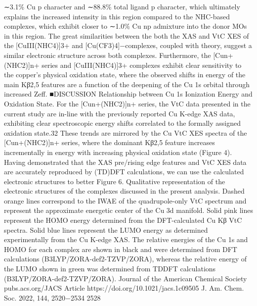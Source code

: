 \documentclass{article}
\begin{document}
∼3.1\% Cu p character and ∼88.8\% total ligand p character,
which ultimately explains the increased intensity in this region
compared to the NHC-based complexes, which exhibit closer
to ∼1.0\% Cu np admixture into the donor MOs in this region.
The great similarities between the both the XAS and VtC
XES of the [CuIII(NHC4)]3+ and [Cu(CF3)4]−complexes,
coupled with theory, suggest a similar electronic structure
across both complexes. Furthermore, the [Cun+(NHC2)]n+
series and [CuIII(NHC4)]3+ complexes exhibit clear sensitivity
to the copper’s physical oxidation state, where the observed
shifts in energy of the main Kβ2,5 features are a function of the
deepening of the Cu 1s orbital through increased Zeff.
■DISCUSSION
Relationship between Cu 1s Ionization Energy and
Oxidation State. For the [Cun+(NHC2)]n+ series, the VtC
data presented in the current study are in-line with the
previously reported Cu K-edge XAS data, exhibiting clear
spectroscopic energy shifts correlated to the formally assigned
oxidation state.32 These trends are mirrored by the Cu VtC
XES spectra of the [Cun+(NHC2)]n+ series, where the
dominant Kβ2,5 feature increases incrementally in energy
with increasing physical oxidation state (Figure 4). Having
demonstrated that the XAS pre/rising edge features and VtC
XES data are accurately reproduced by (TD)DFT calculations,
we can use the calculated electronic structures to better
Figure 6. Qualitative representation of the electronic structures of the complexes discussed in the present analysis. Dashed orange lines correspond
to the IWAE of the quadrupole-only VtC spectrum and represent the approximate energetic center of the Cu 3d manifold. Solid pink lines
represent the HOMO energy determined from the DFT-calculated Cu Kβ VtC spectra. Solid blue lines represent the LUMO energy as determined
experimentally from the Cu K-edge XAS. The relative energies of the Cu 1s and HOMO for each complex are shown in black and were determined
from DFT calculations (B3LYP/ZORA-def2-TZVP/ZORA), whereas the relative energy of the LUMO shown in green was determined from
TDDFT calculations (B3LYP/ZORA-def2-TZVP/ZORA).
Journal of the American Chemical Society
pubs.acs.org/JACS
Article
https://doi.org/10.1021/jacs.1c09505
J. Am. Chem. Soc. 2022, 144, 2520−2534
2528

\newpage

\end{document}
